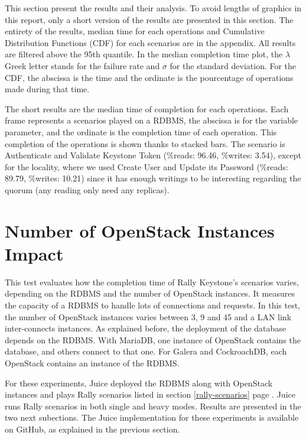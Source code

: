 This section present the results and their analysis. To avoid lengths of graphics in this report, only a short version of the results are presented in this section. The entirety of the results, median time for each operations and Cumulative Distribution Functions (CDF) for each scenarios are in the appendix. All results are filtered above the 95th quantile. In the median completion time plot, the $\lambda$ Greek letter stands for the failure rate and $\sigma$ for the standard deviation. For the CDF, the abscissa is the time and the ordinate is the pourcentage of operations made during that time.



The short results are the median time of completion for each operations. Each frame represents a scenarios played on a RDBMS, the abscissa is for the variable parameter, and the ordinate is the completion time of each operation. This completion of the operations is shown thanks to stacked bars. The scenario is Authenticate and Validate Keystone Token (\%reads: 96.46, \%writes: 3.54), except for the locality, where we used Create User and Update its Password (\%reads: 89.79, \%writes: 10.21) since it has enough writings to be interesting regarding the quorum (any reading only need any replicas).




\section{Number of OpenStack Instances Impact}

This test evaluates how the completion time of Rally Keystone’s scenarios varies, depending on the RDBMS and the number of OpenStack instances. It measures the capacity of a RDBMS to handle lots of connections and requests. In this test, the number of OpenStack instances varies between 3, 9 and 45 and a LAN link inter-connects instances. As explained before, the deployment of the database depends on the RDBMS. With MariaDB, one instance of OpenStack contains the database, and others connect to that one. For Galera and CockroachDB, each OpenStack contains an instance of the RDBMS.

For these experiments, Juice deployed the RDBMS along with OpenStack instances and plays Rally scenarios listed in section \ref{rally-scenarios} page \pageref{rally-scenarios}. Juice runs Rally scenarios in both single and heavy modes. Results are presented in the two next subections. The Juice implementation for these experiments is available on GitHub, as explained in the previous section.


